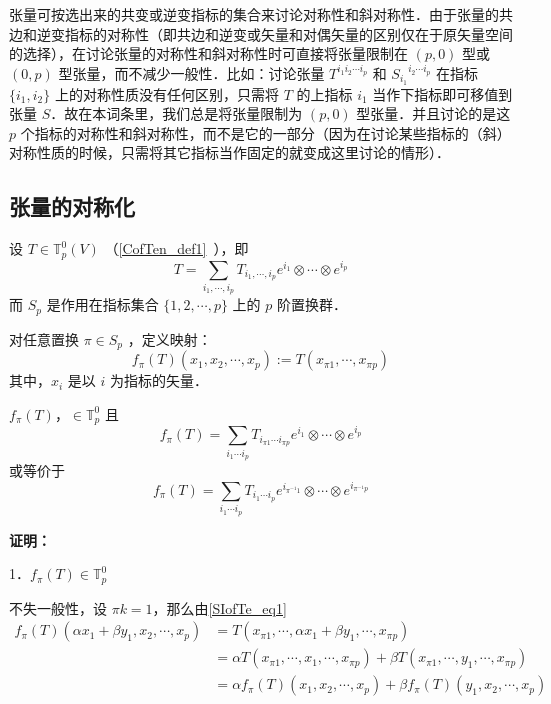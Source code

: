 
\begin{issues}
\issueTODO
\end{issues}

张量可按选出来的共变或逆变指标的集合来讨论对称性和斜对称性．由于张量的共边和逆变指标的对称性（即共边和逆变或矢量和对偶矢量的区别仅在于原矢量空间的选择），在讨论张量的对称性和斜对称性时可直接将张量限制在 $(p,0)$ 型或 $(0,p)$ 型张量，而不减少一般性．比如：讨论张量 $T^{i_1 i_2\cdots i_p}$ 和 ${S_{i_1}}^{i_2\cdots i_p}$ 在指标 $\{i_1,i_2\}$ 上的对称性质没有任何区别，只需将 $T$ 的上指标 $i_1$ 当作下指标即可移值到张量 $S$．故在本词条里，我们总是将张量限制为 $(p,0)$ 型张量．并且讨论的是这 $p$ 个指标的对称性和斜对称性，而不是它的一部分（因为在讨论某些指标的（斜）对称性质的时候，只需将其它指标当作固定的就变成这里讨论的情形）．
\subsection{张量的对称化}
设 $T\in \mathbb{T}_p^0(V)$ （\autoref{CofTen_def1}~），即
\begin{equation}
T=\sum_{i_1,\cdots,i_p}T_{i_1,\cdots,i_p}e^{i_1}\otimes\cdots\otimes e^{i_p}
\end{equation}
而 $S_p$ 是作用在指标集合 $\{1,2,\cdots,p\}$ 上的 $p$ 阶置换群．

对任意置换 $\pi\in S_p$ ，定义映射：
\begin{equation}\label{SIofTe_eq1}
f_\pi(T)(x_1,x_2,\cdots,x_p):=T(x_{\pi1},\cdots,x_{\pi p})
\end{equation}
其中，$x_i$ 是以 $i$ 为指标的矢量．

\begin{theorem}{}
$f_{\pi}(T)，\in\mathbb{T}_p^0$ 且
\begin{equation}\label{SIofTe_eq2}
f_{\pi}(T)=\sum_{i_1\cdots i_p}T_{i_{\pi1}\cdots i_{\pi p}}e^{i_1}\otimes\cdots\otimes e^{i_p}
\end{equation}
或等价于
\begin{equation}\label{SIofTe_eq3}
f_{\pi}(T)=\sum_{i_1\cdots i_p}T_{i_1\cdots i_p}e^{i_{\pi^{-1}1}}\otimes\cdots\otimes e^{i_{\pi^{-1}p}}
\end{equation}
\end{theorem}
\textbf{证明：}

1．$f_\pi(T)\in\mathbb{T}_p^0$

不失一般性，设 $\pi k=1$，那么由\autoref{SIofTe_eq1} 
\begin{equation}
\begin{aligned}
f_\pi(T)(\alpha x_1+\beta y_1,x_2,\cdots,x_p)&=T(x_{\pi1},\cdots,\alpha x_1+\beta y_1,\cdots,x_{\pi p})\\
&=\alpha T(x_{\pi1},\cdots,x_1,\cdots,x_{\pi p})+\beta T(x_{\pi1},\cdots,y_1,\cdots,x_{\pi p})\\
&=\alpha f_{\pi}(T)(x_1,x_2,\cdots,x_p)+\beta f_{\pi}(T)(y_1,x_2,\cdots,x_p)
\end{aligned}
\end{equation}

